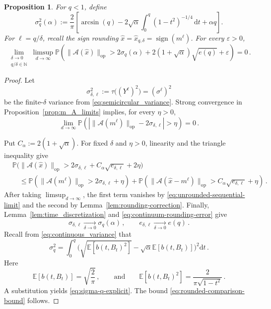 \documentclass[11pt]{article}
\newtheorem{proposition}[theorem]{Proposition}
\theoremstyle{definition}
\theoremstyle{remark}
\numberwithin{equation}{section}
\numberwithin{theorem}{section}
\newcommand{\N}{\mathbb N}
\newcommand{\E}{\mathbb E}
\newcommand{\Prob}{\mathbb P}
\newcommand{\op}{\mathrm{op}}
\newcommand{\cA}{\mathcal A}
\newcommand{\eps}{\varepsilon}
\newcommand{\rmd}{\mathrm{d}}
\begin{document}
\begin{proposition}
\label{prop:rounded-by-comparison}
For $q<1$, define
\begin{equation}\label{eq:sigma-q-explicit}
 \sigma_q^2(\alpha)
 :=
 \frac{2}{\pi}
 \left[
 \arcsin(q)
 -2\sqrt\alpha\int_0^q(1-t^2)^{-1/4}\,\rmd t
 +\alpha q
 \right].
\end{equation}
For $\ell = q/\delta$, recall the sign rounding $\widehat x = \widehat x_{q,\delta} = \operatorname{sign}(m^\ell)$. For every $\eps>0$,
\begin{equation}\label{eq:rounded-comparison-bound}
 \lim_{\substack{\delta\to 0\\q/\delta\in\N}}
 \limsup_{d\to\infty}
 \Prob\left(
 \|\cA(\widehat x)\|_{\op}
 >
 2\sigma_q(\alpha)
 +2(1+\sqrt\alpha)\sqrt{e(q)}
 +\eps
 \right)=0\,.
\end{equation}
\end{proposition}

\begin{proof}
Let
\[
 \sigma_{\delta,\ell}^2:= \tau \big( (Y^\ell)^2\big) = (\sigma^\ell)^2
\]
be the finite-$\delta$ variance from
\eqref{eq:semicircular_variance}.  Strong convergence in Proposition~\ref{prop:m_A_limits} implies, for every $\eta>0$,
\begin{equation}\label{eq:unrounded-sequential-limit}
 \lim_{d \to \infty} \Prob\left(
 \left|
 \|\cA(m^\ell)\|_{\op}-2\sigma_{\delta,\ell}
 \right|>\eta
 \right)= 0\,.
\end{equation}

Put $C_\alpha:=2(1+\sqrt\alpha)$. For fixed $\delta$ and $\eta>0$,
linearity and the triangle inequality give
\[
 \begin{aligned}
 &\Prob\Big(
 \|\cA(\widehat x)\|_{\op}
 >2\sigma_{\delta,\ell}
  +C_\alpha\sqrt{e_{\delta,\ell}}+2\eta
 \Big)\\
 &\quad\le
 \Prob\left(
 \|\cA(m^\ell)\|_{\op}
 >2\sigma_{\delta,\ell}+\eta
 \right) +
 \Prob\left(
 \|\cA(\widehat x-m^\ell)\|_{\op}
 >C_\alpha\sqrt{e_{\delta,\ell}}+\eta
 \right)\,.
 \end{aligned}
\]
After taking $\limsup_{d\to\infty}$, the first
term vanishes by \eqref{eq:unrounded-sequential-limit} and the second by
Lemma~\ref{lem:rounding-correction}.  Finally,
Lemma~\ref{lem:time_discretization} and
\eqref{eq:continuum-rounding-error} give
\[
 \sigma_{\delta,\ell}\xrightarrow[\delta \to 0]{} \sigma_q(\alpha)\,,
 \qquad
 e_{\delta,\ell}\xrightarrow[\delta \to 0]{} e(q)\,.
\]
Recall from \eqref{eq:continuous_variance} that
\begin{equation}\label{eq:continuous_variance2}
\sigma_q^2 = \int_{0}^{q}\Big(\sqrt{\E[b(t,B_t)^2]} - \sqrt{\alpha} \E[b(t,B_t)]\Big)^2 \rmd t\,.
\end{equation}
%
Here
\[
 \E[b(t,B_t)]=\sqrt{\frac2\pi}\,,
 \qquad\mbox{and}\qquad
 \E[b(t,B_t)^2]=\frac{2}{\pi\sqrt{1-t^2}}\,.
\]
A substitution yields \eqref{eq:sigma-q-explicit}. The bound \eqref{eq:rounded-comparison-bound} follows.
\end{proof}
\end{document}

